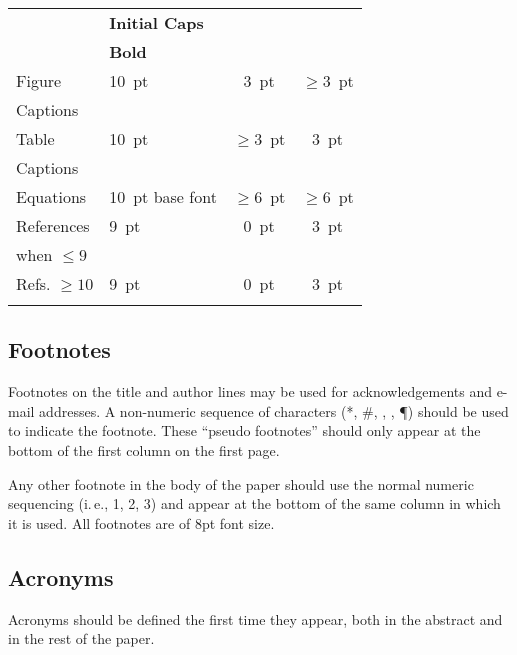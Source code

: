 \documentclass[a4paper,
               keeplastbox,   %
               ]{jacow}
\begin{document}
\begin{table}[h!b]
\begin{tabular}{llcc}
                            & \textbf{Initial Caps}       &                 &      \\
		& \textbf{Bold}               &                 &      \\[5pt]
		Figure        & \SI{10}{pt}                 & \SI{3}{pt}      & $\ge$\SI{3}{pt}  \\
		Captions      &                             &                 &      \\[5pt]
		Table         & \SI{10}{pt}                 & $\ge$\SI{3}{pt} & \SI{3}{pt}  \\
		Captions      &                             &                 &      \\[5pt]
		Equations     & \SI{10}{pt} base font       & $\ge$\SI{6}{pt}     & $\ge$\SI{6}{pt} \\[5pt]
		References      & \SI{9}{pt}				& \SI{0}{pt}      & \SI{3}{pt} \\
        when $\le9$ 	& \verb||	&                 &  \\[5pt]
        Refs. $\ge10$ 	& \SI{9}{pt}				& \SI{0}{pt}      & \SI{3}{pt}  \\
                		& \verb||	&    &    \\
		\bottomrule   %
	\end{tabular}
\end{table}

\subsection{Footnotes}

Footnotes on the title and author lines may be used for acknowledgements
and e-mail addresses. A non-numeric sequence of characters (*, \#,
\dag, \ddag, \P) should be used to indicate the footnote.
These “pseudo footnotes” should only
appear at the bottom of the first column on the first page.

Any other footnote in the body of the paper should
use the normal numeric sequencing (i.\,e., 1, 2, 3)
and appear at the bottom of the same column in which
it is used.  All footnotes are of 8pt font size.

\subsection{Acronyms}

Acronyms should be defined the first time they appear, 
both in the abstract and in the rest of the paper. 
\end{document}
